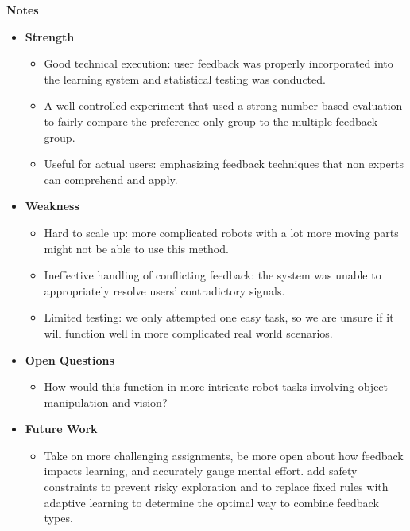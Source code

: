 \documentclass[report.tex]{subfiles}
\begin{document}
\noindent\textbf{Notes}
\begin{itemize}
    \item \noindent\textbf {Strength}
    \begin{itemize}
        \item  Good technical execution: user feedback was properly incorporated into the learning system and statistical testing was conducted. 
        \item A well controlled experiment that used a strong number based evaluation to fairly compare the preference only group to the multiple feedback group. 
        \item   Useful for actual users: emphasizing feedback techniques that non experts can comprehend and apply.
    \end{itemize}
    
    \item \noindent\textbf{Weakness}
    \begin{itemize}
        \item   Hard to scale up: more complicated robots with a lot more moving parts might not be able to use this method. 
    
        \item Ineffective handling of conflicting feedback: the system was unable to appropriately resolve users' contradictory signals. 
        \item Limited testing: we only attempted one easy task, so we are unsure if it will function well in more complicated real world scenarios.
    \end{itemize}
\end{itemize}

\begin{itemize}
    \item \noindent\textbf {Open Questions}
    \begin{itemize}
        \item  How would this function in more intricate robot tasks involving object manipulation and vision? 

    \end{itemize}
    
    \item \noindent\textbf{Future Work}
    \begin{itemize}
        \item  Take on more challenging assignments, be more open about how feedback impacts learning, and accurately gauge mental effort. add safety constraints to prevent risky exploration and to replace fixed rules with adaptive learning to determine the optimal way to combine feedback types. 
        
    \end{itemize}
\end{itemize}
\end{document}
